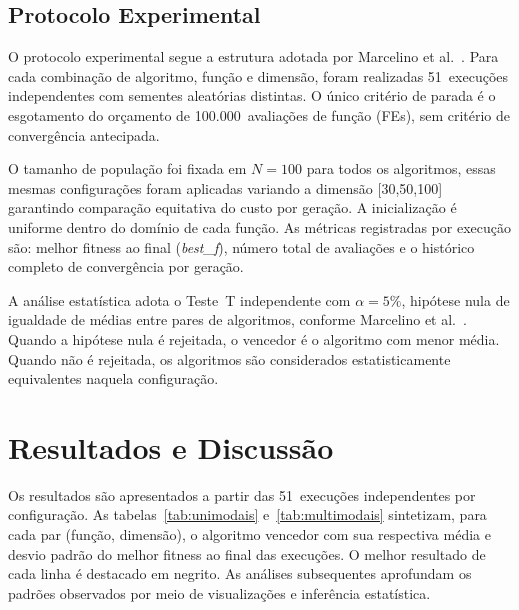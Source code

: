 \documentclass[runningheads]{llncs}
\begin{document}
\subsection{Protocolo Experimental}

O protocolo experimental segue a estrutura adotada por Marcelino
et al.~\cite{marcelino2018}. Para cada combinação de algoritmo,
função e dimensão, foram realizadas 51~execuções independentes com
sementes aleatórias distintas. O único critério de parada é o
esgotamento do orçamento de 100.000~avaliações de função (FEs),
sem critério de convergência antecipada.

O tamanho de população foi fixada em $N=100$ para todos os
algoritmos, essas mesmas configurações foram aplicadas variando a dimensão [30,50,100] garantindo comparação equitativa do custo
por geração. A inicialização é uniforme dentro do domínio de cada
função. As métricas registradas por execução são: melhor fitness
ao final (\emph{best\_f}), número total de avaliações e o
histórico completo de convergência por geração.

A análise estatística adota o Teste~T independente com
$\alpha = 5\%$, hipótese nula de igualdade de médias entre pares
de algoritmos, conforme Marcelino et al.~\cite{marcelino2018}.
Quando a hipótese nula é rejeitada, o vencedor é o algoritmo com
menor média. Quando não é rejeitada, os algoritmos são considerados
estatisticamente equivalentes naquela configuração.

\section{Resultados e Discuss\~{a}o}
\label{sec:resultados}

Os resultados são apresentados a partir das 51~execuções independentes
por configuração. As tabelas~\ref{tab:unimodais} e~\ref{tab:multimodais}
sintetizam, para cada par (função, dimensão), o algoritmo vencedor com
sua respectiva média e desvio padrão do melhor fitness ao final das
execuções. O melhor resultado de cada linha é destacado em negrito.
As análises subsequentes aprofundam os padrões observados por meio
de visualizações e inferência estatística.
\end{document}
